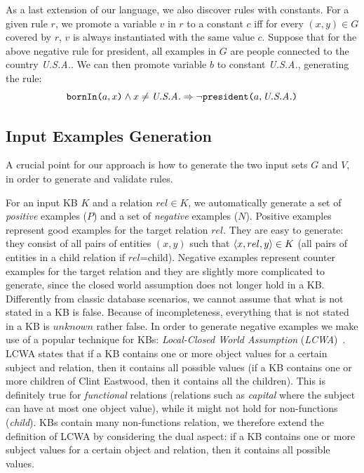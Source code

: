 As a last extension of our language, we also discover rules with constants. For a given rule $r$, we promote a variable $v$ in $r$ to a constant $c$ iff for every $(x,y) \in G$ covered by $r$, $v$ is always instantiated with the same value $c$. Suppose that for the above negative rule for president, all examples in $G$ are people connected to the country \textit{U.S.A.}. We can then promote variable $b$ to constant \textit{U.S.A.}, generating the rule:
$$ \texttt{bornIn(}a,x\texttt{)} \wedge x \neq \emph{U.S.A.} \Rightarrow \neg \texttt{president(}a,\emph{U.S.A.}\texttt{)} $$



\subsection{Input Examples Generation} \label{sec:examples_gen}
A crucial point for our approach is how to generate the two input sets $G$ and $V$, in order to generate and validate rules. 

For an input KB $K$ and a relation $rel \in K$, we automatically generate a set of \emph{positive} examples ($P$) and a set of \emph{negative} examples ($N$). Positive examples represent good examples for the target relation $rel$. They are easy to generate: they consist of all pairs of entities $(x,y)$ such that $\langle x,rel,y\rangle \in K$ (all pairs of entities in a child relation if $rel$=child). Negative examples represent counter examples for the target relation and they are slightly more complicated to generate, since the closed world assumption does not longer hold in a KB. Differently from classic database scenarios, we cannot assume that what is not stated in a KB is false. Because of incompleteness, everything that is not stated in a KB is $unknown$ rather false. In order to generate negative examples we make use of a popular technique for KBs: \emph{Local-Closed World Assumption} (\emph{LCWA})~\cite{dong2014knowledge,galarraga2015fast}. LCWA states that if a KB contains one or more object values for a certain subject and relation, then it contains all possible values (if a KB contains one or more children of Clint Eastwood, then it contains all the children). This is definitely true for \emph{functional} relations (relations such as \emph{capital} where the subject can have at most one object value), while it might not hold for non-functions (\emph{child}). KBs contain many non-functions relation, we therefore extend the definition of LCWA by considering the dual aspect: if a KB contains one or more subject values for a certain object and relation, then it contains all possible values. 

